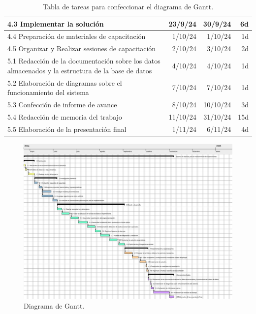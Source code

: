 \documentclass[
11pt, %
]{charter}
\begin{document}
\begin{table}[ht]
\begin{tabularx}{\linewidth}{|X|r|r|r|}
4.3 Implementar la solución & 23/9/24 & 30/9/24 & 6d \\ \hline
4.4 Preparación de materiales de capacitación & 1/10/24 & 1/10/24 & 1d \\ \hline
4.5 Organizar y Realizar sesiones de capacitación & 2/10/24 & 3/10/24 & 2d \\ \hline
5.1 Redacción de la documentación sobre los datos almacenados y la estructura de la base de datos & 4/10/24 & 4/10/24 & 1d \\ \hline
5.2 Elaboración de diagramas sobre el funcionamiento del sistema & 7/10/24 & 7/10/24 & 1d \\ \hline
5.3 Confección de informe de avance & 8/10/24 & 10/10/24 & 3d \\ \hline
5.4 Redacción de memoria del trabajo & 11/10/24 & 31/10/24 & 15d \\ \hline
5.5 Elaboración de la presentación final & 1/11/24 & 6/11/24 & 4d \\ \hline
\end{tabularx}
\caption{Tabla de tareas para confeccionar el diagrama de Gantt.}
\label{tab:diagGantt}
\end{table}

\begin{landscape}
\begin{figure}[htpb]
\centering 
\includegraphics[height=0.97\textheight]{./Figuras/Diagrama_gant.png}
\caption{Diagrama de Gantt.}
\label{fig:diagGantt}
\end{figure}

\end{landscape}
\end{document}

